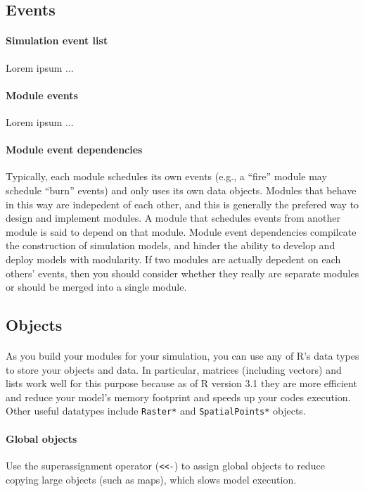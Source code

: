 \documentclass{article}
\begin{document}
\subsection{Events}

\paragraph{Simulation event list}
Lorem ipsum ...

\paragraph{Module events}
Lorem ipsum ...

\paragraph{Module event dependencies}
Typically, each module schedules its own events (e.g., a ``fire'' module may schedule ``burn'' events) and only uses its own data objects. Modules that behave in this way are indepedent of each other, and this is generally the prefered way to design and implement modules. A module that schedules events from another module is said to depend on that module. Module event dependencies compilcate the construction of simulation models, and hinder the ability to develop and deploy models with modularity. If two modules are actually depedent on each others' events, then you should consider whether they really are separate modules or should be merged into a single module.

\subsection{Objects}

\paragraph{}
As you build your modules for your simulation, you can use any of \textsf{R}'s data types to store your objects and data. In particular, matrices (including vectors) and lists work well for this purpose because as of \textsf{R} version 3.1 they are more efficient and reduce your model's memory footprint and speeds up your codes execution. Other useful datatypes include \texttt{Raster*} and \texttt{SpatialPoints*} objects.

\paragraph{Global objects}
Use the superassignment operator (\texttt{<}\texttt{<-}) to assign global objects to reduce copying large objects (such as maps), which slows model execution.
\end{document}
